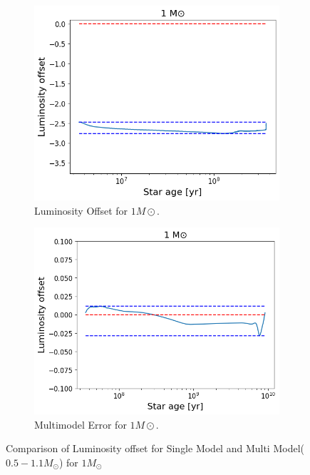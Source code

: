 \begin{figure}[H]
	\centering
	\begin{subfigure}{\textwidth}
		\includegraphics[width=\textwidth,height=0.5\textheight]{assets/error1modelsingle.png}
		\caption{Luminosity Offset for $1M\odot$.}
	\end{subfigure}
	\begin{subfigure}{\textwidth}
		\includegraphics[width=\textwidth,height=0.5\textheight]{assets/error 1.png}
		\caption{Multimodel Error for $1M\odot$.}	
	\end{subfigure}
	\caption{Comparison of Luminosity offset for Single Model and Multi Model($0.5-1.1M_\odot$) for $1M_\odot$}
	\label{fig:lumoff}
\end{figure}

